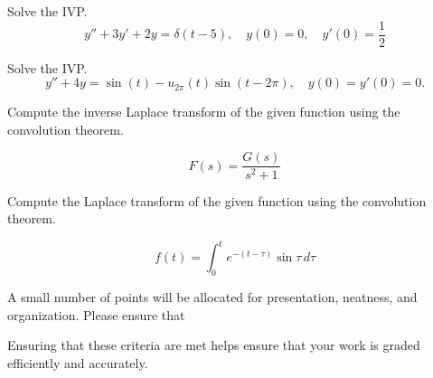 \documentclass[12pt]{exam}
\begin{document}
    


\newpage

\begin{questions}




    \newpage
    
    \question[8] Solve the IVP. $$y''+3y'+2y= \delta(t-5), \quad y(0) = 0, \quad y'(0) = \frac12 $$ %
    
    \newpage 
    
    \question[7] Solve the IVP. $$y''+4y= \sin(t) - u_{2\pi} (t) \sin(t - 2\pi), \quad y(0) = y'(0) = 0 . $$ %
    
    \newpage
    
    \question[2] Compute the inverse Laplace transform of the given function using the convolution theorem. 
    
    $$F(s) = \frac{G(s)}{s^2+1}$$ %
    
    \vspace{8cm}
    
    \question[2] Compute the Laplace transform of the given function using the convolution theorem. 
    
    $$f(t) = \int_0^t e^{-(t-\tau)}\sin \tau \, d\tau$$ %
    
    \newpage 

    \question[1] A small number of points will be allocated for presentation, neatness, and organization. Please ensure that
    Ensuring that these criteria are met helps ensure that your work is graded efficiently and accurately. 

\end{questions}
\end{document}
